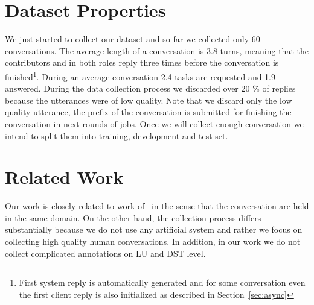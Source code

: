\documentclass[runningheads,a4paper]{llncs}
\def\OP#1{#1}  %
\begin{document}
\section{Dataset Properties} \label{sec:props}
\vspace{-0.50em}
We just started to collect our dataset and so far we collected only 60 conversations.
The average length of a conversation is \OP{3.8} turns, meaning that the contributors and in both roles reply three times before the conversation is finished\footnote{First system reply is automatically generated and for some conversation even the first client reply is also initialized as described in Section~\ref{sec:async}}.
During an average conversation \OP{2.4} tasks are requested and \OP{1.9} answered.
During the data collection process we discarded over \OP{20} \% of replies because the utterances were of low quality.
Note that we discard only the low quality utterance, the prefix of the conversation is submitted for finishing the conversation in next rounds of jobs.
Once we will collect enough conversation we intend to split them into training, development and test set. %


\section{Related Work} \label{sec:related}
\vspace{-0.50em}
Our work is closely related  to work of~\cite{williams2013dstc1,henderson2014dstc2,henderson2014dstc3} in the sense that the conversation are held in the same domain.
On the other hand, the collection process differs substantially because we do not use any artificial system and rather we focus on collecting high quality human conversations. In addition, in our work we do not collect complicated annotations on LU and DST level.
\end{document}
